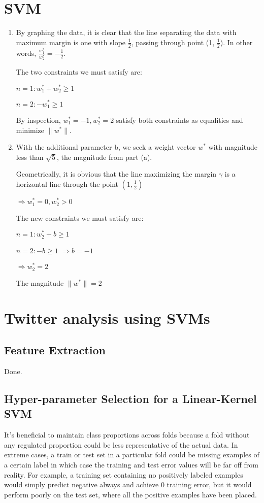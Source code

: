 \documentclass[11pt]{article}
\begin{document}
\section{SVM}
\begin{enumerate}
\item %
By graphing the data, it is clear that the line separating the data with maximum margin is one with slope $\frac{1}{2}$, passing through point (1, $\frac{1}{2}$). In other words, $\frac{w_1^*}{w_2^*} = -\frac{1}{2}$.
\vspace{0.5cm}

The two constraints we must satisfy are:

$n=1: w_1^* + w_2^* \geq 1$

$n=2: -w_1^* \geq 1$

By inspection, $w_1^* = -1, w_2^* = 2$ satisfy both constraints as equalities and minimize $\| \textbf{$w^*$} \|$.

\item %
With the additional parameter b, we seek a weight vector $\textbf{$w^*$}$ with magnitude less than $\sqrt{5}$, the magnitude from part (a).

Geometrically, it is obvious that the line maximizing the margin $\gamma$ is a horizontal line through the point $(1, \frac{1}{2})$

$\Rightarrow w_1^* = 0, w_2^* > 0$

The new constraints we must satisfy are:

$n=1: w_2^* + b \geq 1$

$n=2: -b \geq 1$
\newline \newline
$\Rightarrow b = -1$

$\Rightarrow w_2^* = 2$

The magnitude $\| \textbf{$w^*$} \| = 2$
\end{enumerate}

\section{Twitter analysis using SVMs}
\subsection{Feature Extraction}
Done.

\subsection{Hyper-parameter Selection for a Linear-Kernel SVM}
It's beneficial to maintain class proportions across folds because a fold without any regulated proportion could be less representative of the actual data. In extreme cases, a train or test set in a particular fold could be missing examples of a certain label in which case the training and test error values will be far off from reality. 
\newline \newline
For example, a training set containing no positively labeled examples would simply predict negative always and achieve 0 training error, but it would perform poorly on the test set, where all the positive examples have been placed.
\end{document}
